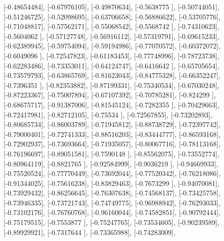 \documentclass{article}
\begin{document}
       [-0.48654484],
       [-0.67976105],
       [-0.49870634],
       [-0.5638775 ],
       [-0.50744051],
       [-0.51246725],
       [-0.52098695],
       [-0.63706658],
       [-0.56886622],
       [-0.53705776],
       [-0.71048817],
       [-0.57562171],
       [-0.55068542],
       [-0.5568742 ],
       [-0.74310623],
       [-0.5604062 ],
       [-0.57127748],
       [-0.56916112],
       [-0.57319791],
       [-0.69615233],
       [-0.62389945],
       [-0.59754094],
       [-0.59194986],
       [-0.77070572],
       [-0.60372072],
       [-0.6049096 ],
       [-0.72547823],
       [-0.61183453],
       [-0.77748996],
       [-0.78723738],
       [-0.62283486],
       [-0.73353011],
       [-0.64124747],
       [-0.6416642 ],
       [-0.65705654],
       [-0.73579793],
       [-0.63865769],
       [-0.81623043],
       [-0.84775328],
       [-0.66352247],
       [-0.7396351 ],
       [-0.82353882],
       [-0.87199331],
       [-0.75340534],
       [-0.67030248],
       [-0.87223367],
       [-0.75007894],
       [-0.67107392],
       [-0.70785281],
       [-0.824299  ],
       [-0.68675717],
       [-0.91387006],
       [-0.81545124],
       [-0.7282355 ],
       [-0.70429663],
       [-0.72417981],
       [-0.82712105],
       [-0.75534   ],
       [-0.72567855],
       [-0.73202893],
       [-0.80685734],
       [-0.86003789],
       [-0.71945812],
       [-0.88738729],
       [-0.72397742],
       [-0.79000401],
       [-0.72741333],
       [-0.88516203],
       [-0.83444777],
       [-0.86593168],
       [-0.72902937],
       [-0.73693664],
       [-0.71935057],
       [-0.80067716],
       [-0.78113168],
       [-0.76196697],
       [-0.89051581],
       [-0.7590148 ],
       [-0.85562075],
       [-0.73552774],
       [-0.80964119],
       [-0.8821765 ],
       [-0.92584999],
       [-0.9036219 ],
       [-0.94669933],
       [-0.75520524],
       [-0.77770449],
       [-0.73692044],
       [-0.77520342],
       [-0.76218086],
       [-0.91344025],
       [-0.75616238],
       [-0.83829463],
       [-0.7673299 ],
       [-0.94070081],
       [-0.73929432],
       [-0.86256645],
       [-0.76307638],
       [-0.74568137],
       [-0.73425758],
       [-0.73946335],
       [-0.73721743],
       [-0.74749775],
       [-0.96988942],
       [-0.76293033],
       [-0.73102176],
       [-0.76760768],
       [-0.96160044],
       [-0.74582851],
       [-0.90792444],
       [-0.75179515],
       [-0.7553877 ],
       [-0.75247765],
       [-0.73534605],
       [-0.90239589],
       [-0.89929921],
       [-0.7317644 ],
       [-0.73365988],
       [-0.74283009],
\end{document}
